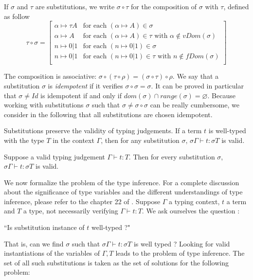 \begin{defn} If $\sigma$ and $\tau$ are substitutions, we write $\sigma \circ \tau$ for the composition of $\sigma$ with $\tau$, defined as follow
		$$\tau \circ \sigma = \left[ \begin{array}{ll}
																			\alpha \mapsto \tau A & \text{for each } (\alpha \mapsto A) \in \sigma \\
																			\alpha \mapsto A & \text{for each } (\alpha \mapsto A) \in \tau \text{ with } \alpha \notin vDom(\sigma) \\
																			n \mapsto 0|1 & \text{for each } (n \mapsto 0|1) \in \sigma \\
																			n \mapsto 0|1 & \text{for each } (n \mapsto 0|1) \in \tau \text{ with } n \notin fDom(\sigma) \\
																		\end{array} \right]$$
\end{defn}

The composition is associative: $\sigma \circ (\tau \circ \rho) = (\sigma \circ \tau) \circ \rho$. We say that a substitution
$\sigma$ is \textit{idempotent} if it verifies $\sigma \circ \sigma = \sigma$. It can be proved in particular that $\sigma \neq Id$ is idempotent if and only if $dom(\sigma) \cap range(\sigma) = \varnothing$. Because working with substitutions $\sigma$ such that
$\sigma \neq \sigma \circ \sigma$ can be really cumbersome, we consider in the following that all substitutions are chosen idempotent.

Substitutions preserve the validity of typing judgements. If a term $t$ is well-typed with the
type $T$ in the context $\Gamma$, then for any substitution $\sigma$, $\sigma \Gamma \vdash t : \sigma T$ is valid.

\begin{thm}
	\label{subs-judgement}
	Suppose a valid typing judgement $\Gamma \vdash t : T$. Then for every substitution $\sigma$, $\sigma \Gamma \vdash t : \sigma T$
	is valid.
\end{thm}

We now formalize the problem of the type inference. For a complete discussion about the significance of type variables
and the different understandings of type inference, please refer to the chapter 22 of \cite{pierce02}.
Suppose $\Gamma$ a typing context, $t$ a term and $T$ a type, not necessarily verifying $\Gamma \vdash t : T$. We ask ourselves the
question :
 \begin{center}
 	 ``Is  substitution instance of $t$ well-typed ?"
 \end{center}
That is, can we find $\sigma$ such that $\sigma \Gamma \vdash t : \sigma T$ is well typed ? Looking for valid instantiations of the
variables of $\Gamma, T$ leads to the problem of type inference. The set of all such substitutions is taken as the set of solutions
for the following problem:

